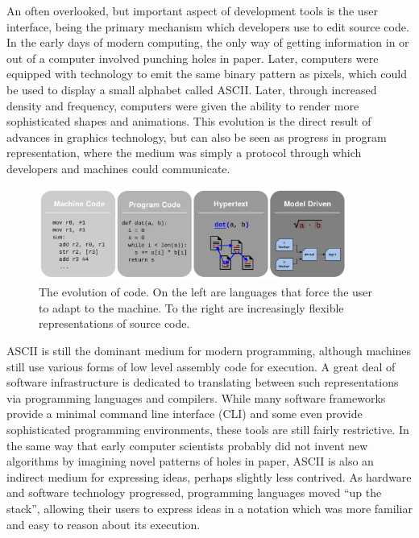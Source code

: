 \documentclass[12pt,initial,twoside,maitrise]{dms}
\numberwithin{equation}{section}
\numberwithin{table}{chapter}
\numberwithin{figure}{chapter}
\begin{document}
An often overlooked, but important aspect of development tools is the user interface, being the primary mechanism which developers use to edit source code. In the early days of modern computing, the only way of getting information in or out of a computer involved punching holes in paper. Later, computers were equipped with technology to emit the same binary pattern as pixels, which could be used to display a small alphabet called ASCII. Later, through increased density and frequency, computers were given the ability to render more sophisticated shapes and animations. This evolution is the direct result of advances in graphics technology, but can also be seen as progress in program representation, where the medium was simply a protocol through which developers and machines could communicate.

\begin{figure}
    \centering
    \includegraphics[width=0.90\textwidth]{progress_in_program.png}
    \caption{The evolution of code. On the left are languages that force the user to adapt to the machine. To the right are increasingly flexible representations of source code.}
    \label{fig:evolution_of_programming}
\end{figure}

ASCII is still the dominant medium for modern programming, although machines still use various forms of low level assembly code for execution. A great deal of software infrastructure is dedicated to translating between such representations via programming languages and compilers. While many software frameworks provide a minimal command line interface (CLI) and some even provide sophisticated programming environments, these tools are still fairly restrictive. In the same way that early computer scientists probably did not invent new algorithms by imagining novel patterns of holes in paper, ASCII is also an indirect medium for expressing ideas, perhaps slightly less contrived. As hardware and software technology progressed, programming languages moved ``up the stack'', allowing their users to express ideas in a notation which was more familiar and easy to reason about its execution.
\end{document}
